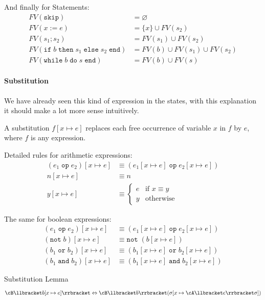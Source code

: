 And finally for Statements:
\begin{align*}
    FV(\texttt{skip})                                                                  & = \varnothing                     \\
    FV(x := e)                                                                         & = \{ x \} \cup FV(s_2)            \\
    FV(s_1; s_2)                                                                       & = FV(s_1) \cup FV(s_2)            \\
    FV(\texttt{if}\; b\; \texttt{then} \; s_1 \; \texttt{else} \; s_2 \; \texttt{end}) & = FV(b) \cup FV(s_1) \cup FV(s_2) \\
    FV(\texttt{while}\; b\; \texttt{do} \; s \; \texttt{end})                          & = FV(b) \cup FV(s)
\end{align*}


\paragraph{Substitution}
{\scriptsize We have already seen this kind of expression in the states, with this explanation it should make a lot more sense intuitively.}

A substitution $f[x \mapsto e]$ replaces each free occurrence of variable $x$ in $f$ by $e$, where $f$ is any expression.

Detailed rules for arithmetic expressions:
\begin{align*}
    (e_1 \; \texttt{op} \; e_2)[x \mapsto e] & \equiv (e_1[x \mapsto e] \; \texttt{op} \; e_2[x \mapsto e]) \\
    n[x \mapsto e]                           & \equiv n                                                     \\
    y[x \mapsto e]                           & \equiv \begin{cases}
                                                          e & \text{if } x \equiv y \\
                                                          y & \text{otherwise}
                                                      \end{cases}
\end{align*}

The same for boolean expressions:
\begin{align*}
    (e_1 \; \texttt{op} \; e_2)[x \mapsto e]  & \equiv (e_1[x \mapsto e] \; \texttt{op} \; e_2[x \mapsto e])  \\
    (\texttt{not} \; b)[x \mapsto e]          & \equiv \texttt{not} \; (b[x \mapsto e])                       \\
    (b_1 \; \texttt{or} \; b_2)[x \mapsto e]  & \equiv (b_1[x \mapsto e] \; \texttt{or} \; b_2[x \mapsto e])  \\
    (b_1 \; \texttt{and} \; b_2)[x \mapsto e] & \equiv (b_1[x \mapsto e] \; \texttt{and} \; b_2[x \mapsto e])
\end{align*}

\begin{lemma}[]{Substitution Lemma}
    \[
        \cB\llbracket b[x \mapsto e] \rrbracket \Leftrightarrow \cB\llbracket b \rrbracket (\sigma[x \mapsto \cA\llbracket e \rrbracket \sigma])
    \]
\end{lemma}
